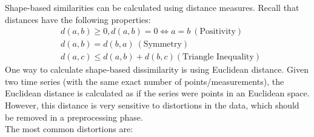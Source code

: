 Shape-based similarities can be calculated using distance measures. Recall that distances have the following properties:
\begin{align*}
    &d(a,b) \geq 0, d(a,b) = 0 \iff a = b \ (\text{Positivity}) \\
    &d(a,b) = d(b,a) \ (\text{Symmetry}) \\
    &d(a,c) \leq d(a,b) + d(b,c) (\text{Triangle Inequality})
\end{align*}
One way to calculate shape-based dissimilarity is using Euclidean distance. Given two time series (with the same exact number of points/measurements), the Euclidean distance is calculated as if the series were points in an Euclidean space. However, this distance is very sensitive to distortions in the data, which should be removed in a preprocessing phase.\\
The most common distortions are:
